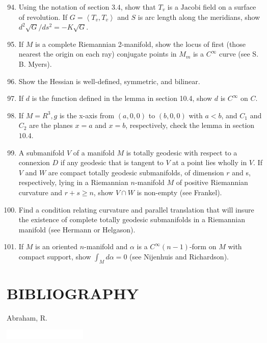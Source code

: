 \documentclass[10pt]{article}
\begin{document}
\begin{enumerate}
  \setcounter{enumi}{93}
  \item Using the notation of section $3.4$, show that $T_{v}$ is a $\mathrm{Jacobi}$ field on a surface of revolution. If $G=\left\langle T_{v}, T_{v}\right\rangle$ and $S$ is arc length along the meridians, show $d^{2} \sqrt{G} / d s^{2}=-K \sqrt{G}$.

  \item If $M$ is a complete Riemannian 2-manifold, show the locus of first (those nearest the origin on each ray) conjugate points in $M_{m}$ is a $C^{\infty}$ curve (see S. B. Myers).

  \item Show the Hessian is well-defined, symmetric, and bilinear.

  \item If $d$ is the function defined in the lemma in section 10.4, show $d$ is $C^{\infty}$ on $C$.

  \item If $M=R^{3}, g$ is the x-axis from $(a, 0,0)$ to $(b, 0,0)$ with $a<b$, and $C_{1}$ and $C_{2}$ are the planes $x=a$ and $x=b$, respectively, check the lemma in section $10.4$.

  \item A submanifold $V$ of a manifold $M$ is totally geodesic with respect to a connexion $D$ if any geodesic that is tangent to $V$ at a point lies wholly in $V$. If $V$ and $W$ are compact totally geodesic submanifolds, of dimension $r$ and s, respectively, lying in a Riemannian $n$-manifold $M$ of positive Riemannian curvature and $r+s \geq n$, show $V \cap W$ is non-empty (see Frankel).

  \item Find a condition relating curvature and parallel translation that will insure the existence of complete totally geodesic submanifolds in a Riemannian manifold (see Hermann or Helgason).

  \item If $M$ is an oriented $n$-manifold and $\alpha$ is a $C^{\infty}(n-1)$-form on $M$ with compact support, show $\int_{M} d \alpha=0$ (see Nijenhuis and Richardson).

\end{enumerate}
\section{BIBLIOGRAPHY}
Abraham, R.

\includegraphics[max width=\textwidth]{2022_07_16_f4e476ee2159dc67e746g-92}
\end{document}
